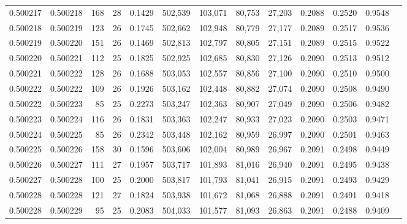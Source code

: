 \begin{tabular}{rrrrrrrrrrrrr}
0.500217 & 0.500218 & 168 &  28 &                                     0.1429 & 502,539 & 103,071 &  80,753 &  27,203 & 0.2088 & 0.2520 & 0.9548 \\
0.500218 & 0.500219 & 123 &  26 &                                     0.1745 & 502,662 & 102,948 &  80,779 &  27,177 & 0.2089 & 0.2517 & 0.9536 \\
0.500219 & 0.500220 & 151 &  26 &                                     0.1469 & 502,813 & 102,797 &  80,805 &  27,151 & 0.2089 & 0.2515 & 0.9522 \\
0.500220 & 0.500221 & 112 &  25 &                                     0.1825 & 502,925 & 102,685 &  80,830 &  27,126 & 0.2090 & 0.2513 & 0.9512 \\
0.500221 & 0.500222 & 128 &  26 &                                     0.1688 & 503,053 & 102,557 &  80,856 &  27,100 & 0.2090 & 0.2510 & 0.9500 \\
0.500222 & 0.500222 & 109 &  26 &                                     0.1926 & 503,162 & 102,448 &  80,882 &  27,074 & 0.2090 & 0.2508 & 0.9490 \\
0.500222 & 0.500223 &  85 &  25 &                                     0.2273 & 503,247 & 102,363 &  80,907 &  27,049 & 0.2090 & 0.2506 & 0.9482 \\
0.500223 & 0.500224 & 116 &  26 &                                     0.1831 & 503,363 & 102,247 &  80,933 &  27,023 & 0.2090 & 0.2503 & 0.9471 \\
0.500224 & 0.500225 &  85 &  26 &                                     0.2342 & 503,448 & 102,162 &  80,959 &  26,997 & 0.2090 & 0.2501 & 0.9463 \\
0.500225 & 0.500226 & 158 &  30 &                                     0.1596 & 503,606 & 102,004 &  80,989 &  26,967 & 0.2091 & 0.2498 & 0.9449 \\
0.500226 & 0.500227 & 111 &  27 &                                     0.1957 & 503,717 & 101,893 &  81,016 &  26,940 & 0.2091 & 0.2495 & 0.9438 \\
0.500227 & 0.500228 & 100 &  25 &                                     0.2000 & 503,817 & 101,793 &  81,041 &  26,915 & 0.2091 & 0.2493 & 0.9429 \\
0.500228 & 0.500228 & 121 &  27 &                                     0.1824 & 503,938 & 101,672 &  81,068 &  26,888 & 0.2091 & 0.2491 & 0.9418 \\
0.500228 & 0.500229 &  95 &  25 &                                     0.2083 & 504,033 & 101,577 &  81,093 &  26,863 & 0.2091 & 0.2488 & 0.9409 \\

\end{tabular}
